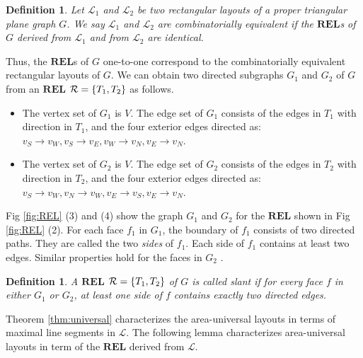 \documentclass[11pt]{article}
\newcommand{\R}{{\cal R}}
\newcommand{\LL}{\mathcal{L}}
\newcommand{\REL}{\mathbf{REL}}
\newtheorem{definition}[figure]{Definition}
\begin{document}
\begin{definition}
Let $\LL_1$ and $\LL_2$ be two rectangular layouts of a proper triangular
plane graph $G$. We say $\LL_1$ and $\LL_2$ are {\rm combinatorially
equivalent} if the $\REL$s of $G$ derived from $\LL_1$ and
from $\LL_2$  are identical.
\end{definition}

Thus, the $\REL$s of $G$ one-to-one correspond to
the combinatorially equivalent rectangular layouts of $G$.
We can obtain two directed subgraphs $G_1$ and $G_2$ of $G$ from
an $\REL$ $\R=\{T_1, T_2\}$ as follows.

\begin{itemize}
\item The vertex set of $G_1$ is $V$. The edge set of $G_1$ consists of
the edges in $T_1$ with direction in $T_1$, and the four exterior edges
directed as: $v_S \rightarrow v_W, v_S \rightarrow v_E,
v_W \rightarrow v_N, v_E \rightarrow v_N$.
\item The vertex set of $G_2$ is $V$. The edge set of $G_2$ consists of
the edges in $T_2$ with direction in $T_2$, and the four exterior edges
directed as: $v_S \rightarrow v_W, v_N \rightarrow v_W,
v_E \rightarrow v_S, v_E \rightarrow v_N$.
\end{itemize}

Fig \ref{fig:REL} (3) and (4) show the graph $G_1$ and $G_2$
for the $\REL$ shown in Fig \ref{fig:REL} (2).
For each face $f_1$ in $G_1$, the boundary of $f_1$ consists of two
directed paths. They are called the two {\em sides} of $f_1$.
Each side of $f_1$ contains at least two edges. Similar properties
hold for the faces in $G_2$ \cite{Fu06,Fu09,He93,KH97}.

\begin{definition}
A $\REL$ $\R=\{T_1, T_2\}$ of $G$ is called {\em slant}
if for every face $f$ in either $G_1$ or $G_2$, at least one
side of $f$ contains exactly two directed edges.
\end{definition}

Theorem \ref{thm:universal} characterizes the area-universal layouts in terms
of maximal line segments in $\LL$. The following lemma characterizes
area-universal layouts in term of the $\REL$ derived from $\LL$.
\end{document}
